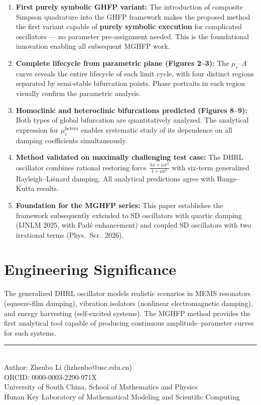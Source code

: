 \documentclass[11pt,a4paper]{article}
\begin{document}
\begin{enumerate}[leftmargin=2em]
\item \textbf{First purely symbolic GHFP variant:} The introduction of composite Simpson quadrature into the GHFP framework makes the proposed method the first variant capable of \textbf{purely symbolic execution} for complicated oscillators --- no parameter pre-assignment needed. This is the foundational innovation enabling all subsequent MGHFP work.

\item \textbf{Complete lifecycle from parametric plane (Figures 2--3):} The $\mu_c$--$A$ curve reveals the entire lifecycle of each limit cycle, with four distinct regions separated by semi-stable bifurcation points. Phase portraits in each region visually confirm the parametric analysis.

\item \textbf{Homoclinic and heteroclinic bifurcations predicted (Figures 8--9):} Both types of global bifurcation are quantitatively analyzed. The analytical expression for $\mu_c^{\mathrm{hetero}}$ enables systematic study of its dependence on all damping coefficients simultaneously.

\item \textbf{Method validated on maximally challenging test case:} The DHRL oscillator combines rational restoring force $\frac{\lambda x + \mu x^3}{1+\nu x^2}$ with six-term generalized Rayleigh--Li\'enard damping. All analytical predictions agree with Runge--Kutta results.

\item \textbf{Foundation for the MGHFP series:} This paper establishes the framework subsequently extended to SD oscillators with quartic damping (IJNLM 2025, with Pad\'e enhancement) and coupled SD oscillators with two irrational terms (Phys.\ Scr.\ 2026).
\end{enumerate}

\section{Engineering Significance}

The generalized DHRL oscillator models realistic scenarios in MEMS resonators (squeeze-film damping), vibration isolators (nonlinear electromagnetic damping), and energy harvesting (self-excited systems). The MGHFP method provides the first analytical tool capable of producing continuous amplitude--parameter curves for such systems.

\vfill
\begin{center}
\small\rule{0.5\textwidth}{0.3pt}\\[4pt]
\small\color{primary} Author: Zhenbo Li (lizhenbo@usc.edu.cn)\\
\small ORCID: 0000-0003-2290-971X\\
\small University of South China, School of Mathematics and Physics\\
\small Hunan Key Laboratory of Mathematical Modeling and Scientific Computing
\end{center}
\end{document}
